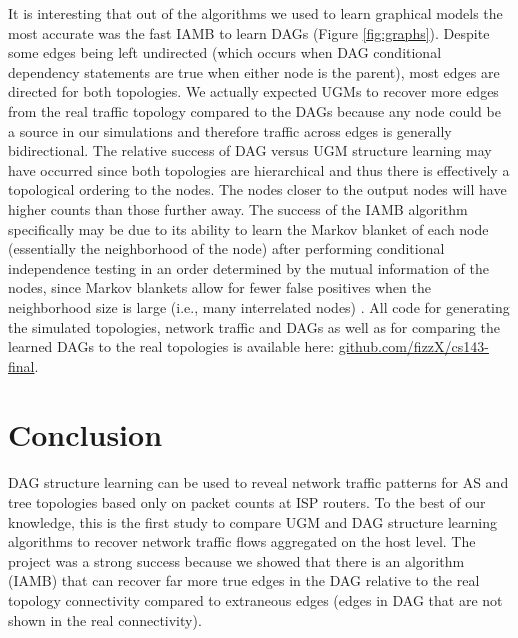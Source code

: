\documentclass[conference]{IEEEtran}
\begin{document}
It is interesting that out of the algorithms we used to learn graphical models the most accurate was the fast IAMB to learn DAGs (Figure \ref{fig:graphs}). Despite some edges being left undirected (which occurs when DAG conditional dependency statements are true when either node is the parent), most edges are directed for both topologies. We actually expected UGMs to recover more edges from the real traffic topology compared to the DAGs because any node could be a source in our simulations and therefore traffic across edges is generally bidirectional. The relative success of DAG versus UGM structure learning may have occurred since both topologies are hierarchical and thus there is effectively a topological ordering to the nodes. The nodes closer to the output nodes will have higher counts than those further away. The success of the IAMB algorithm specifically may be due to its ability to learn the Markov blanket of each node (essentially the neighborhood of the node) after performing conditional independence testing in an order determined by the mutual information of the nodes, since Markov blankets allow for fewer false positives when the neighborhood size is large (i.e., many interrelated nodes) \cite{b12}. All code for generating the simulated topologies, network traffic and DAGs as well as for comparing the learned DAGs to the real topologies is available here: \href{https://github.com/fizzX/cs143-final}{github.com/fizzX/cs143-final}.

\section{Conclusion}

DAG structure learning can be used to reveal network traffic patterns for AS and tree topologies based only on packet counts at ISP routers. To the best of our knowledge, this is the first study to compare UGM and DAG structure learning algorithms to recover network traffic flows aggregated on the host level. The project was a strong success because we showed that there is an algorithm (IAMB) that can recover far more true edges in the DAG relative to the real topology connectivity compared to extraneous edges (edges in DAG that are not shown in the real connectivity).
\end{document}
